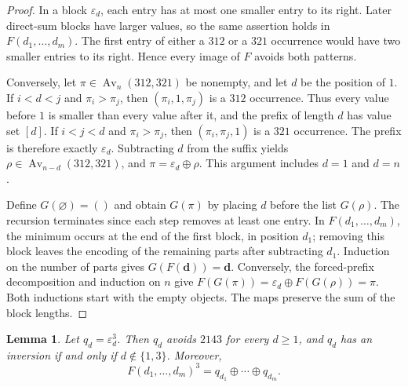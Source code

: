 \documentclass[11pt]{article}
\newtheorem{lemma}[theorem]{Lemma}
\newcommand{\Av}{\operatorname{Av}}
\newcommand{\eps}{\varepsilon}
\begin{document}
\begin{proof}
In a block $\eps_d$, each entry has at most one smaller entry to its
right. Later direct-sum blocks have larger values, so the same assertion
holds in $F(d_1,\ldots,d_m)$. The first entry of either a $312$ or a
$321$ occurrence would have two smaller entries to its right. Hence
every image of $F$ avoids both patterns.

Conversely, let $\pi\in\Av_n(312,321)$ be nonempty, and let $d$ be the
position of $1$. If $i<d<j$ and $\pi_i>\pi_j$, then
$(\pi_i,1,\pi_j)$ is a $312$ occurrence. Thus every value before $1$
is smaller than every value after it, and the prefix of length $d$
has value set $[d]$. If $i<j<d$ and $\pi_i>\pi_j$, then
$(\pi_i,\pi_j,1)$ is a $321$ occurrence. The prefix is therefore
exactly $\eps_d$. Subtracting $d$ from the suffix yields
$\rho\in\Av_{n-d}(312,321)$, and $\pi=\eps_d\oplus\rho$.
This argument includes $d=1$ and $d=n$.

Define $G(\varnothing)=()$ and obtain $G(\pi)$ by placing $d$ before
the list $G(\rho)$. The recursion terminates since each step removes
at least one entry. In $F(d_1,\ldots,d_m)$, the minimum occurs at the
end of the first block, in position $d_1$; removing this block leaves
the encoding of the remaining parts after subtracting $d_1$.
Induction on the number of parts gives $G(F(\mathbf d))=\mathbf d$.
Conversely, the forced-prefix decomposition and induction on $n$ give
$F(G(\pi))=\eps_d\oplus F(G(\rho))=\pi$. Both inductions start
with the empty objects. The maps preserve the sum of the block lengths.
\end{proof}

\begin{lemma}\label{lem:cubes}
Let $q_d=\eps_d^3$. Then $q_d$ avoids $2143$ for every $d\geq1$,
and $q_d$ has an inversion if and only if $d\notin\{1,3\}$.
Moreover,
\begin{equation}\label{eq:power-sum}
F(d_1,\ldots,d_m)^3=q_{d_1}\oplus\cdots\oplus q_{d_m}.
\end{equation}
\end{lemma}
\end{document}
